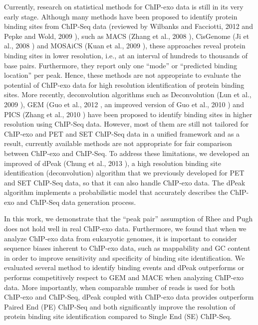 \documentclass[11pt]{article}\usepackage[]{graphicx}\usepackage[]{color}
\begin{document}
Currently, research on statistical methods for ChIP-exo data is still
in its very early stage. Although many methods have been proposed to
identify protein binding sites from ChIP-Seq data (reviewed by
Wilbanks and Facciotti, 2012 \cite{evaluation} and Pepke and Wold,
2009 \cite{computation}), such as MACS (Zhang et al., 2008
\cite{macs}), CisGenome (Ji et al., 2008 \cite{cisgenome}) and
MOSAiCS (Kuan et al., 2009 \cite{mosaics}), these approaches reveal
protein binding sites in lower resolution, i.e., at an interval of
hundreds to thousands of base pairs. Furthermore, they report only one
``mode'' or ``predicted binding location'' per peak. Hence, these
methods are not appropriate to evaluate the potential of ChIP-exo data
for high resolution identification of protein binding sites. More
recently, deconvolution algorithms such as Deconvolution (Lun et al.,
2009 \cite{csdeconv}), GEM (Guo et al., 2012 \cite{gem}, an improved
version of Guo et al., 2010 \cite{gps} ) and PICS (Zhang et al., 2010
\cite{pics}) have been proposed to identify binding sites in higher
resolution using ChIP-Seq data. However, most of them are still not
tailored for ChIP-exo and PET and SET ChIP-Seq data in a unified
framework and as a result, currently available methods are not
appropriate for fair comparison between ChIP-exo and ChIP-Seq. To
address these limitations, we developed an improved of dPeak (Chung et
al., 2013 \cite{dpeak}), a high resolution binding site identification
(deconvolution) algorithm that we previously developed for PET and SET
ChIP-Seq data, so that it can also handle ChIP-exo data. The dPeak
algorithm implements a probabilistic model that accurately describes
the ChIP-exo and ChIP-Seq data generation process.

In this work, we demonstrate that the ``peak pair'' assumption of Rhee
and Pugh \cite{exo1} does not hold well in real ChIP-exo
data. Furthermore, we found that when we analyze ChIP-exo data from
eukaryotic genomes, it is important to consider sequence biases
inherent to ChIP-exo data, such as mappability and GC content in order
to improve sensitivity and specificity of binding site
identification. We evaluated several method to identify binding events
and dPeak outperforms or performs competitively respect to GEM and
MACE when analyzing ChIP-exo data. More importantly, when comparable
number of reads is used for both ChIP-exo and ChIP-Seq, dPeak coupled
with ChIP-exo data provides outperform Paired End (PE) ChIP-Seq and
both significantly improve the resolution of protein binding site
identification compared to Single End (SE) ChIP-Seq.
\end{document}
